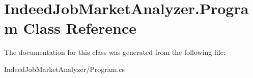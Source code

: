 \hypertarget{class_indeed_job_market_analyzer_1_1_program}{}\section{Indeed\+Job\+Market\+Analyzer.\+Program Class Reference}
\label{class_indeed_job_market_analyzer_1_1_program}


The documentation for this class was generated from the following file\+:\begin{DoxyCompactItemize}
\item 
Indeed\+Job\+Market\+Analyzer/Program.\+cs\end{DoxyCompactItemize}
